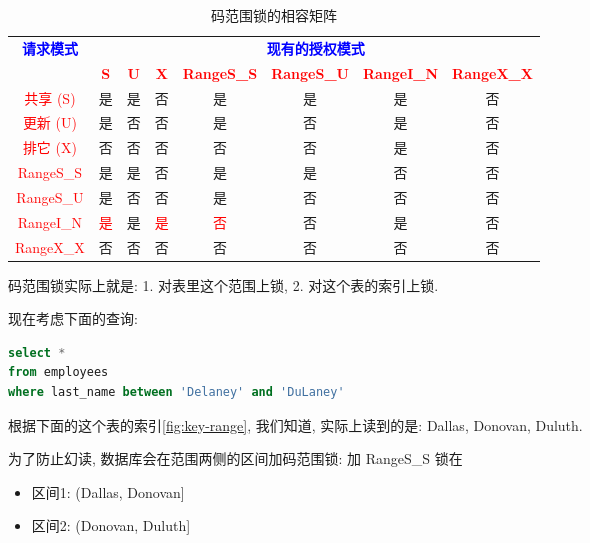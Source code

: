 \begin{table}[H]
    \centering
    \begin{tabular}{|c|c|c|c|c|c|c|c|}
        \hline
        \multirow{2}{*}{\textbf{\textcolor{blue}{请求模式}}} & \multicolumn{7}{c|}{\textbf{\textcolor{blue}{现有的授权模式}}} \\ \cline{2-8}
         & \textcolor{red}{\textbf{S}} & \textcolor{red}{\textbf{U}} & \textcolor{red}{\textbf{X}} 
         & \textcolor{red}{\textbf{RangeS\_S}} & \textcolor{red}{\textbf{RangeS\_U}} 
         & \textcolor{red}{\textbf{RangeI\_N}} & \textcolor{red}{\textbf{RangeX\_X}} \\ \hline
         
        \textcolor{red}{共享 (S)} & 是 & 是 & 否 & 是 & 是 & 是 & 否 \\ \hline
        \textcolor{red}{更新 (U)} & 是 & 否 & 否 & 是 & 否 & 是 & 否 \\ \hline
        \textcolor{red}{排它 (X)} & 否 & 否 & 否 & 否 & 否 & 是 & 否 \\ \hline

        \rowcolor{lightred}
        \textcolor{red}{RangeS\_S} & 是 & 是 & 否 & 是 & 是 & 否 & 否 \\ \hline
        \rowcolor{lightred}
        \textcolor{red}{RangeS\_U} & 是 & 否 & 否 & 是 & 否 & 否 & 否 \\ \hline
        \rowcolor{lightred}
        \textcolor{red}{RangeI\_N} & \textcolor{red}{是} & 是 & \textcolor{red}{是} & \textcolor{red}{否} & 否 & 是 & 否 \\ \hline
        \rowcolor{lightred}
        \textcolor{red}{RangeX\_X} & 否 & 否 & 否 & 否 & 否 & 否 & 否 \\ \hline
    \end{tabular}
    \caption{码范围锁的相容矩阵}
\end{table}

码范围锁实际上就是: 1. 对表里这个范围上锁, 2. 对这个表的索引上锁.

现在考虑下面的查询:
\begin{lstlisting}[language=SQL]
select *
from employees
where last_name between 'Delaney' and 'DuLaney'
\end{lstlisting}

根据下面的这个表的索引\ref{fig:key-range}, 我们知道, 实际上读到的是: Dallas, Donovan, Duluth.

为了防止幻读, 数据库会在范围两侧的区间加码范围锁: 加 RangeS\_S 锁在
\begin{itemize}
  \item 区间1: (Dallas, Donovan]
  \item 区间2: (Donovan, Duluth]
\end{itemize}

